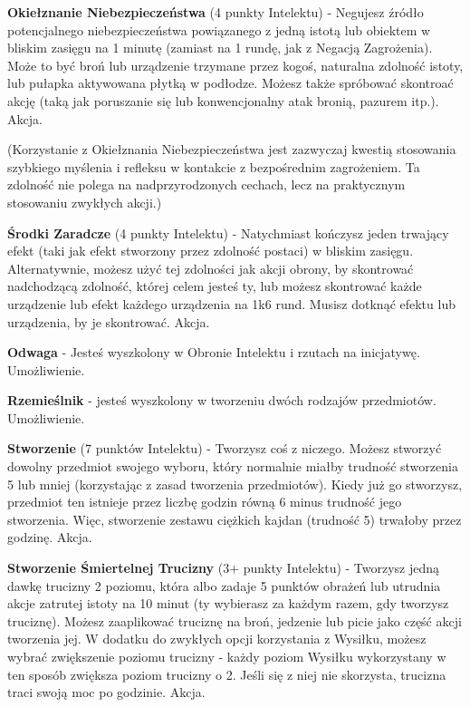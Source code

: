 {\textbf{Okiełznanie Niebezpieczeństwa}\label{sec:Okiełznanie Niebezpieczeństwa} (4 punkty Intelektu) - Negujesz źródło potencjalnego niebezpieczeństwa powiązanego z jedną istotą lub obiektem w bliskim zasięgu na 1 minutę (zamiast na 1 rundę, jak z Negacją Zagrożenia). Może to być broń lub urządzenie trzymane przez kogoś, naturalna zdolność istoty, lub pułapka aktywowana płytką w podłodze. Możesz także spróbować skontroać akcję (taką jak poruszanie się lub konwencjonalny atak bronią, pazurem itp.). Akcja.

(Korzystanie z Okiełznania Niebezpieczeństwa jest zazwyczaj kwestią stosowania szybkiego myślenia i refleksu w kontakcie z bezpośrednim zagrożeniem. Ta zdolność nie polega na nadprzyrodzonych cechach, lecz na praktycznym stosowaniu zwykłych akcji.)

\textbf{Środki Zaradcze}\label{sec:Środki Zaradcze} (4 punkty Intelektu) - Natychmiast kończysz jeden trwający efekt (taki jak efekt stworzony przez zdolność postaci) w bliskim zasięgu. Alternatywnie, możesz użyć tej zdolności jak akcji obrony, by skontrować nadchodzącą zdolność, której celem jesteś ty, lub możesz skontrować każde urządzenie lub efekt każdego urządzenia na 1k6 rund. Musisz dotknąć efektu lub urządzenia, by je skontrować. Akcja.

\textbf{Odwaga}\label{sec:Odwaga} - Jesteś wyszkolony w Obronie Intelektu i rzutach na inicjatywę. Umożliwienie. 

\textbf{Rzemieślnik}\label{sec:Rzemieślnik} - jesteś wyszkolony w tworzeniu dwóch rodzajów przedmiotów. Umożliwienie. 

\textbf{Stworzenie}\label{sec:Stworzenie} (7 punktów Intelektu) - Tworzysz coś z niczego. Możesz stworzyć dowolny przedmiot swojego wyboru, który normalnie miałby trudność stworzenia 5 lub mniej (korzystając z zasad tworzenia przedmiotów). Kiedy już go stworzysz, przedmiot ten istnieje przez liczbę godzin równą 6 minus trudność jego stworzenia. Więc, stworzenie zestawu ciężkich kajdan (trudność 5) trwałoby przez godzinę. Akcja.

\textbf{Stworzenie Śmiertelnej Trucizny}\label{sec:Stworzenie Śmiertelnej Trucizny} (3+ punkty Intelektu) - Tworzysz jedną dawkę trucizny 2 poziomu, która albo zadaje 5 punktów obrażeń lub utrudnia akcje zatrutej istoty na 10 minut (ty wybierasz za każdym razem, gdy tworzysz truciznę). Możesz zaaplikować truciznę na broń, jedzenie lub picie jako część akcji tworzenia jej. W dodatku do zwykłych opcji korzystania z Wysiłku, możesz wybrać zwiększenie poziomu trucizny - każdy poziom Wysiłku wykorzystany w ten sposób zwiększa poziom trucizny o 2. Jeśli się z niej nie skorzysta, trucizna traci swoją moc po godzinie. Akcja. 

}
